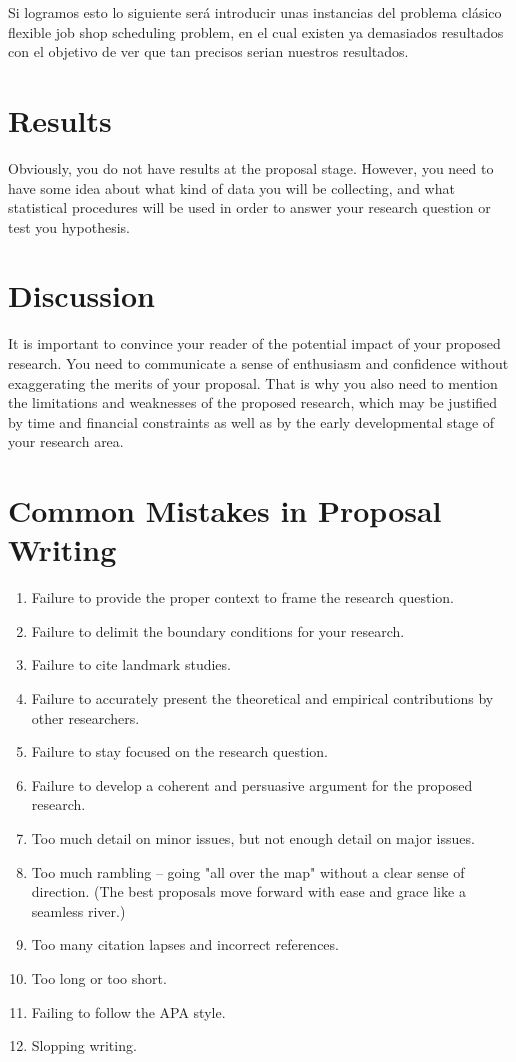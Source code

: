 \documentclass[a4paper, 12pt]{article}
\begin{document}
Si logramos esto lo siguiente será introducir unas instancias del problema clásico flexible job shop scheduling problem, en el cual existen ya demasiados resultados con el objetivo  de ver que tan precisos serian nuestros resultados.
\section{Results}
Obviously, you do not have results at the proposal stage. However, you need to have
some idea about what kind of data you will be collecting, and what statistical
procedures will be used in order to answer your research question or test you
hypothesis.
\section{Discussion}
It is important to convince your reader of the potential impact of your proposed
research. You need to communicate a sense of enthusiasm and confidence without
exaggerating the merits of your proposal. That is why you also need to mention the
limitations and weaknesses of the proposed research, which may be justified by time
and financial constraints as well as by the early developmental stage of your
research area.
\section*{Common Mistakes in Proposal Writing}
\begin{enumerate}
	\item Failure to provide the proper context to frame the research question.
	\item Failure to delimit the boundary conditions for your research.
	\item Failure to cite landmark studies.
	\item Failure to accurately present the theoretical and empirical contributions by other researchers.
	\item Failure to stay focused on the research question.
	\item Failure to develop a coherent and persuasive argument for the proposed research.
	\item Too much detail on minor issues, but not enough detail on major issues.
	\item Too much rambling -- going "all over the map" without a clear sense of direction. (The best proposals move forward with ease and grace like a seamless river.)
	\item Too many citation lapses and incorrect references.
	\item Too long or too short.
	\item Failing to follow the APA style.
	\item Slopping writing.
\end{enumerate}
\end{document}
